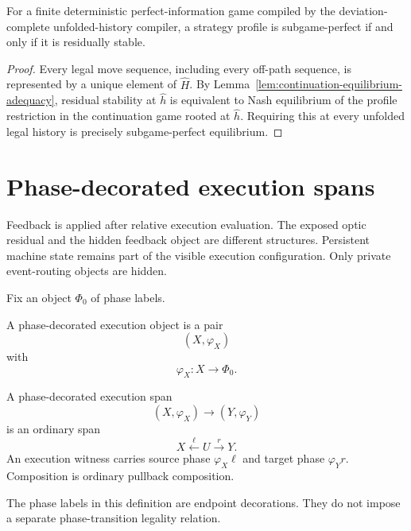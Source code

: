 \begin{theorem}
\label{thm:subgame-perfection}
For a finite deterministic perfect-information game compiled by the deviation-complete
unfolded-history compiler, a strategy profile is subgame-perfect if and only if it is residually
stable.
\end{theorem}

\begin{proof}
Every legal move sequence, including every off-path sequence, is represented by a unique element of
\(\widehat H\). By Lemma~\ref{lem:continuation-equilibrium-adequacy}, residual stability at
\(\widehat h\) is equivalent to Nash equilibrium of the profile restriction in the continuation
game rooted at \(\widehat h\). Requiring this at every unfolded legal history is precisely
subgame-perfect equilibrium.
\end{proof}

\section{Phase-decorated execution spans}
\label{sec:phase-indexed-execution-spans}

Feedback is applied after relative execution evaluation. The exposed optic residual and the hidden
feedback object are different structures. Persistent machine state remains part of the visible
execution configuration. Only private event-routing objects are hidden.

Fix an object \(\Phi_0\) of phase labels.

\begin{definition}
\label{def:phase-indexed-execution-object}
A phase-decorated execution object is a pair
\[
  (X,\varphi_X)
\]
with
\[
  \varphi_X:X\to\Phi_0.
\]
\end{definition}

\begin{definition}
\label{def:phase-decorated-execution-span}
A phase-decorated execution span
\[
  (X,\varphi_X)\longrightarrow(Y,\varphi_Y)
\]
is an ordinary span
\[
  X\xleftarrow{\ell}U\xrightarrow{r}Y.
\]
An execution witness carries source phase \(\varphi_X\ell\) and target phase \(\varphi_Yr\).
Composition is ordinary pullback composition.
\end{definition}

The phase labels in this definition are endpoint decorations. They do not impose a separate
phase-transition legality relation.

